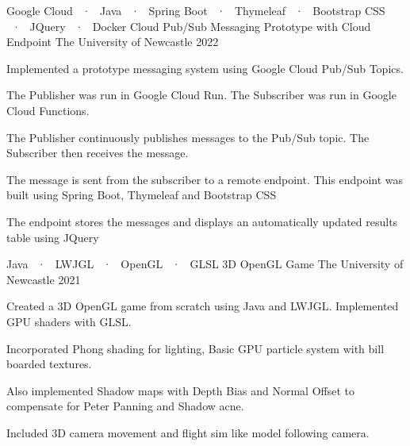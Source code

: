\begin{cventries}
  \cventry
  {Google Cloud ~·~ Java ~·~ Spring Boot ~·~ Thymeleaf ~·~ Bootstrap CSS ~·~ JQuery ~·~ Docker } %
  {Cloud Pub/Sub Messaging Prototype with Cloud Endpoint} %
  {The University of Newcastle} %
  {2022} %
  {
    \begin{cvitems} %
      \item {Implemented a prototype messaging system using Google Cloud Pub/Sub Topics.}
      \item {The Publisher was run in Google Cloud Run. The Subscriber was run in Google Cloud Functions.}
      \item {The Publisher continuously publishes messages to the Pub/Sub topic. The Subscriber then receives the message.}
      \item {The message is sent from the subscriber to a remote endpoint. This endpoint was built using Spring Boot, Thymeleaf and Bootstrap CSS}
      \item {The endpoint stores the messages and displays an automatically updated results table using JQuery}
    \end{cvitems}
  }

  \cventry
  {Java ~·~ LWJGL ~·~ OpenGL ~·~ GLSL} %
  {3D OpenGL Game} %
  {The University of Newcastle} %
  {2021} %
  {
    \begin{cvitems} %
      \item {Created a 3D OpenGL game from scratch using Java and LWJGL. Implemented GPU shaders with GLSL.}
      \item {Incorporated Phong shading for lighting, Basic GPU particle system with bill boarded textures.}
      \item {Also implemented Shadow maps with Depth Bias and Normal Offset to compensate for Peter Panning and Shadow acne.}
      \item {Included 3D camera movement and flight sim like model following camera.}
    \end{cvitems}
  }
\end{cventries}